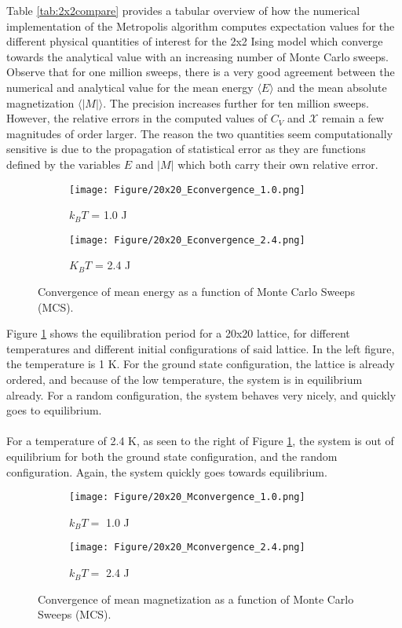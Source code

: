 Table \ref{tab:2x2compare} provides a tabular overview of how the numerical implementation of the Metropolis algorithm computes expectation values for the different physical quantities of interest for the 2x2 Ising model which converge towards the analytical value with an increasing number of Monte Carlo sweeps. Observe that for one million sweeps, there is a very good agreement between the numerical and analytical value for the mean energy $\langle E \rangle$ and the mean absolute magnetization $\langle |M| \rangle$. The precision increases further for ten million sweeps. However, the relative errors in the computed values of $C_V$ and $\mathcal{X}$ remain a few magnitudes of order larger. The reason the two quantities seem computationally sensitive is due to the propagation of statistical error as they are functions defined by the variables $E$ and $|M|$ which both carry their own relative error. 


\begin{figure}[H]
		\centering
		\begin{subfigure}{0.48\linewidth}
			\texttt{[image: Figure/20x20\_Econvergence\_1.0.png]}
			\caption{$k_B T$ = 1.0 J}
		\end{subfigure}
		\begin{subfigure}{0.48\linewidth}
			\texttt{[image: Figure/20x20\_Econvergence\_2.4.png]}
			\caption{$K_B T $ = 2.4 J}
		\end{subfigure}
		\caption{Convergence of mean energy as a function of Monte Carlo Sweeps (MCS).}
		\label{econvergence}
	\end{figure}
	
Figure \ref{econvergence} shows the equilibration period for a 20x20 lattice, for different temperatures and different initial configurations of said lattice. In the left figure, the temperature is 1 K. For the ground state configuration, the lattice is already ordered, and because of the low temperature, the system is in equilibrium already. For a random configuration, the system behaves very nicely, and quickly goes to equilibrium.\\
\\
For a temperature of 2.4 K, as seen to the right of Figure \ref{econvergence}, the system is out of equilibrium for both the ground state configuration, and the random configuration. Again, the system quickly goes towards equilibrium.

\begin{figure}[H]
		\centering
		\begin{subfigure}{0.48\linewidth}
			\texttt{[image: Figure/20x20\_Mconvergence\_1.0.png]}
			\caption{$k_B T = $ 1.0 J}
		\end{subfigure}
		\begin{subfigure}{0.48\linewidth}
			\texttt{[image: Figure/20x20\_Mconvergence\_2.4.png]}
			\caption{$k_B T = $ 2.4 J}
		\end{subfigure}
		\caption{Convergence of mean magnetization as a function of Monte Carlo Sweeps (MCS).}
		\label{mconvergence}
	\end{figure}
	
